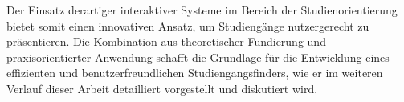 Der Einsatz derartiger interaktiver Systeme im Bereich der Studienorientierung bietet somit einen innovativen Ansatz, um Studiengänge nutzergerecht zu präsentieren. Die Kombination aus theoretischer Fundierung und praxisorientierter Anwendung schafft die Grundlage für die Entwicklung eines effizienten und benutzerfreundlichen Studiengangsfinders, wie er im weiteren Verlauf dieser Arbeit detailliert
vorgestellt und diskutiert wird.